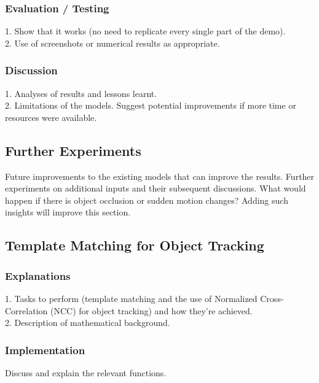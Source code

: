 \documentclass[10pt,twocolumn,letterpaper]{article}
\begin{document}
\subsubsection{Evaluation / Testing}
1. Show that it works (no need to replicate every single part of the demo). \\
2. Use of screenshots or numerical results as appropriate.

\subsubsection{Discussion}
1. Analyses of results and lessons learnt. \\
2. Limitations of the models. Suggest potential improvements if more time or resources were available.

\subsection{Further Experiments}
Future improvements to the existing models that can improve the results. Further experiments on additional inputs and their subsequent discussions. What would happen if there is object occlusion or sudden motion changes? Adding such insights will improve this section.

\subsection{Template Matching for Object Tracking}

\subsubsection{Explanations}
1. Tasks to perform (template matching and the use of Normalized Cross-Correlation (NCC) for object tracking) and how they're achieved. \\
2. Description of mathematical background.

\subsubsection{Implementation}
Discuss and explain the relevant functions.
\end{document}
